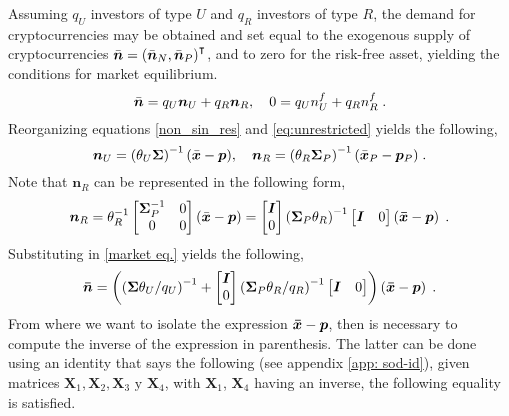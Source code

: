 Assuming $q_{U}$ investors of type $U$ and $q_R$ investors of type $R$, the demand for cryptocurrencies may be obtained and set equal to the exogenous supply of cryptocurrencies $\Bar{\bm{n}} = \left(\Bar{\bm{n}}_N, \Bar{\bm{n}}_P\right)^{\intercal}$, and to zero for the risk-free asset, yielding the conditions for market equilibrium.
\begin{equation}
	\Bar{\bm{n}} = q_{U}\bm{n}_{U} + q_{R}\bm{n}_{R},\quad 0 = q_{U}n^{f}_{U} + q_{R}n^{f}_{R}\;.\label{market eq.}
\end{equation}
Reorganizing equations \eqref{non_sin_res} and \eqref{eq:unrestricted} yields the following,
\begin{equation*}
	\bm{n}_{U} = \left(\theta_{U}\bm{\Sigma}\right)^{-1}(\Bar{\bm{x}} - \bm{p}),\quad \bm{n}_{R} = \left(\theta_{R}\bm{\Sigma}_{P}\right)^{-1}(\Bar{\bm{x}}_{P} - \bm{p}_{P})\;. 
\end{equation*}
Note that $\bm{n}_R$ can be represented in the following form,
\begin{equation*}
	\bm{n}_R = \theta^{-1}_{R}\begin{bmatrix}
		\bm{\Sigma}^{-1}_{P} & 0\\
		0 & 0
	\end{bmatrix}
	(\Bar{\bm{x}}-\bm{p}) = \begin{bmatrix}
		\bm{I}\\
		0
	\end{bmatrix}
	\left(\bm{\Sigma}_P\theta_R\right)^{-1}\begin{bmatrix}
		\bm{I} & 0
	\end{bmatrix}
	\left(\bm{\Bar{x}}-\bm{p}\right)\;.
\end{equation*}
Substituting in \eqref{market eq.} yields the following,
\begin{equation}
	\bm{\Bar{n}}=\left(\left(\bm{\Sigma}\theta_U/q_U\right)^{-1}+\begin{bmatrix}
		\bm{I}\\
		0
	\end{bmatrix}
	\left(\bm{\Sigma}_P \theta_R/q_R\right)^{-1}\begin{bmatrix}
		\bm{I} & 0
	\end{bmatrix}\right)\left(\bm{\Bar{\bm{x}}}-\bm{p}\right)\;.
	\label{eq:dem_exogena}
\end{equation}
From where we want to isolate the expression $\bm{\Bar{x}}-\bm{p}$, then is necessary to compute the inverse of the expression in parenthesis. The latter can be done using an identity that says the following (see appendix \ref{app: sod-id}), given matrices $\bm{X}_1, \bm{X}_2, \bm{X}_3 \text{ y } \bm{X}_4$, with $\bm{X}_1$, $\bm{X}_4$ having an inverse, the following equality is satisfied.
